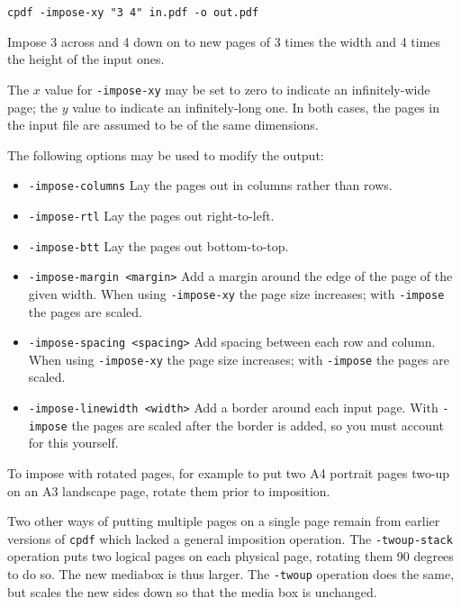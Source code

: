 \documentclass{book}
\begin{document}
  \begin{framed}
    \noindent\small\verb!cpdf -impose-xy "3 4" in.pdf -o out.pdf!
 
    \vspace{2.5mm}
    \noindent Impose 3 across and 4 down on to new pages of 3 times the width and 4 times the height of the input ones. 
  \end{framed}

\noindent The $x$ value for \texttt{-impose-xy} may be set to zero to indicate an infinitely-wide page; the $y$ value to indicate an infinitely-long one. In both cases, the pages in the input file are assumed to be of the same dimensions.

The following options may be used to modify the output:

\begin{itemize}
\item \texttt{-impose-columns} Lay the pages out in columns rather than rows.
\item \texttt{-impose-rtl} Lay the pages out right-to-left.
\item \texttt{-impose-btt} Lay the pages out bottom-to-top.
\item \texttt{-impose-margin <margin>} Add a margin around the edge of the page of the given width. When using \texttt{-impose-xy} the page size increases; with \texttt{-impose} the pages are scaled.
\item \texttt{-impose-spacing <spacing>} Add spacing between each row and column. When using \texttt{-impose-xy} the page size increases; with \texttt{-impose} the pages are scaled.
\item \texttt{-impose-linewidth <width>} Add a border around each input page. With \texttt{-impose} the pages are scaled after the border is added, so you must account for this yourself.

\end{itemize}

\noindent To impose with rotated pages, for example to put two A4 portrait pages two-up on an A3 landscape page, rotate them prior to imposition.

Two other ways of putting multiple pages on a single page remain from earlier versions of \texttt{cpdf} which lacked a general imposition operation.  The \texttt{-twoup-stack} operation puts two logical pages on each physical
page, rotating them 90 degrees to do so. The new mediabox is thus larger. The \texttt{-twoup} operation does the same, but scales the new sides down so
that the media box is unchanged.
\end{document}
